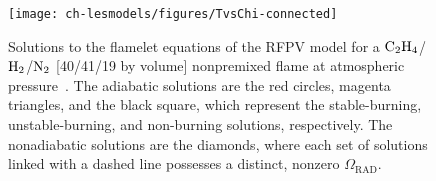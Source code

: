 \begin{figure}[htb]
  \centering
  \texttt{[image: ch-lesmodels/figures/TvsChi-connected]}
  \caption[Flamelet Solutions of RFPV Model, $T|Z_{st}$ vs. $\chi|Z_{st}$]{Solutions to the flamelet equations of the RFPV model for a $\ce{C2H4}$/$\ce{H2}$/$\ce{N2}$ [40/41/19 by volume] nonpremixed flame at atmospheric pressure~\cite{mahmoud2017}. The adiabatic solutions are the red circles, magenta triangles, and the black square, which represent the stable-burning, unstable-burning, and non-burning solutions, respectively. The nonadiabatic solutions are the diamonds, where each set of solutions linked with a dashed line possesses a distinct, nonzero $\Omega_{\text{RAD}}$.}
  \label{fig:lesmodels:combust:flamelet:tvschi}
\end{figure}
